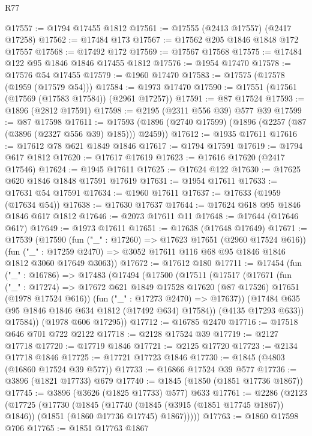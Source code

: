 \begin{lexlean}{R77}
\begin{coremodule}
@17557 := @1794 @17455 @1812
@17561 := @17555 (@2413 @17557) (@2417 @17258)
@17562 := @17484 @173
@17567 := @17562 @205 @1846 @1848 @172 @17557
@17568 := @17492 @172
@17569 := @17567 @17568
@17575 := @17484 @122 @95 @1846 @1846 @17455 @1812
@17576 := @1954 @17470
@17578 := @17576 @54 @17455
@17579 := @1960 @17470
@17583 := @17575 (@17578 (@1959 (@17579 @54)))
@17584 := @1973 @17470
@17590 := @17551 (@17561 (@17569 (@17583 @17584)) (@2961 @17257))
@17591 := @87 @17524
@17593 := @1896 (@2812 @17591)
@17598 := @2195 (@2311 @556 @39) @577 @39
@17599 := @87 @17598
@17611 := @17593 (@1896 (@2740 @17599) (@1896 (@2257 (@87 (@3896 (@2327 @556 @39) @185))) @2459))
@17612 := @1935 @17611
@17616 := @17612 @78 @621 @1849 @1846
@17617 := @1794 @17591
@17619 := @1794 @617 @1812
@17620 := @17617 @17619
@17623 := @17616 @17620 (@2417 @17546)
@17624 := @1945 @17611
@17625 := @17624 @122
@17630 := @17625 @620 @1846 @1848 @17591 @17619
@17631 := @1954 @17611
@17633 := @17631 @54 @17591
@17634 := @1960 @17611
@17637 := @17633 (@1959 (@17634 @54))
@17638 := @17630 @17637
@17644 := @17624 @618 @95 @1846 @1846 @617 @1812
@17646 := @2073 @17611 @11
@17648 := @17644 (@17646 @617)
@17649 := @1973 @17611
@17651 := @17638 (@17648 @17649)
@17671 := @17539
    (@17590
      (fun ("_" : @17260) => @17623 @17651 (@2960 @17524 @616))
      (fun ("_" : @17259 @2470) => @3052 @17611 @116 @68 @95 @1846 @1846 @1812 @3060 @17649 @3063))
@17672 := @17612 @180
@17711 := @17454
    (fun ("_" : @16786) =>
    @17483
      (@17494
        (@17500
          (@17511
            (@17517
              (@17671
                (fun ("_" : @17274) =>
                @17672 @621 @1849 @17528 @17620 (@87 @17526) @17651 (@1978 @17524 @616))
                (fun ("_" : @17273 @2470) => @17637))
              (@17484 @635 @95 @1846 @1846 @634 @1812 (@17492 @634) @17584))
            (@4135 @17293 @633))
          @17584))
      (@1978 @606 @17295))
@17712 := @16785 @2470
@17716 := @17518 @646 @701 @722 @2122
@17718 := @2128 @17524 @39
@17719 := @2127 @17718
@17720 := @17719 @1846
@17721 := @2125 @17720
@17723 := @2134 @17718 @1846
@17725 := @17721 @17723 @1846
@17730 := @1845 (@4803 (@16860 @17524 @39 @577))
@17733 := @16866 @17524 @39 @577
@17736 := @3896 (@1821 @17733) @679
@17740 := @1845 (@1850 (@1851 @17736 @1867))
@17745 := @3896 (@3626 (@1825 @17733) @577) @633
@17761 := @2286
    (@2123
      (@17725
        (@17730
          (@1845
            (@17740 (@1845 (@3915 (@1851 @17745 @1867)) @1846))
            (@1851 (@1860 @17736 @17745) @1867)))))
@17763 := @1860 @17598 @706
@17765 := @1851 @17763 @1867

\end{coremodule}
\end{lexlean}
